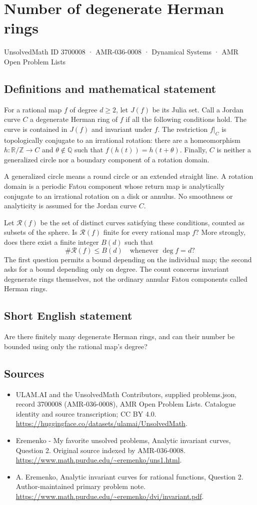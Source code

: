 \documentclass[11pt,a4paper]{article}
\begin{document}
\section*{Number of degenerate Herman rings}\label{3700008}
{\small UnsolvedMath ID 3700008 · AMR-036-0008 · Dynamical Systems · AMR Open Problem Lists}
\subsection{Definitions and mathematical statement}
For a rational map $f$ of degree $d\geq2$, let $J(f)$
be its Julia set. Call a Jordan curve $C$ a degenerate
Herman ring of $f$ if all the following conditions hold.
The curve is contained in $J(f)$ and invariant under $f$.
The restriction $f|_C$ is topologically conjugate to an
irrational rotation: there are a homeomorphism
$h:\mathbb R/\mathbb Z\to C$ and $\theta\notin\mathbb Q$
such that $f(h(t))=h(t+\theta)$.
Finally, $C$ is neither a generalized circle nor a boundary
component of a rotation domain.

A generalized circle means a round circle or an extended
straight line. A rotation domain is a periodic Fatou component
whose return map is analytically conjugate to an irrational
rotation on a disk or annulus. No smoothness or analyticity
is assumed for the Jordan curve $C$.

Let $\mathcal R(f)$ be the set of distinct curves satisfying
these conditions, counted as subsets of the sphere.
Is $\mathcal R(f)$ finite for every rational map $f$?
More strongly, does there exist a finite integer $B(d)$ such
that
\[
                    \#\mathcal R(f)\leq B(d)
             \quad\text{whenever }\deg f=d?
\]
The first question permits a bound depending on the individual
map; the second asks for a bound depending only on degree.
The count concerns invariant degenerate rings themselves,
not the ordinary annular Fatou components called Herman rings.
\subsection{Short English statement}
Are there finitely many degenerate Herman rings, and can their number be bounded using only the rational map's degree?
\subsection{Sources}
\begin{itemize}
\item[S1] ULAM.AI and the UnsolvedMath Contributors, supplied problems.json, record 3700008 (AMR-036-0008), AMR Open Problem Lists. Catalogue identity and source transcription; CC BY 4.0.
\url{https://huggingface.co/datasets/ulamai/UnsolvedMath}.
\item[S2] Eremenko - My favorite unsolved problems, Analytic invariant curves, Question 2. Original source indexed by AMR-036-0008.
\url{https://www.math.purdue.edu/~eremenko/uns1.html}.
\item[S3] A. Eremenko, Analytic invariant curves for rational functions, Question 2. Author-maintained primary problem note.
\url{https://www.math.purdue.edu/~eremenko/dvi/invariant.pdf}.
\end{itemize}
\end{document}

